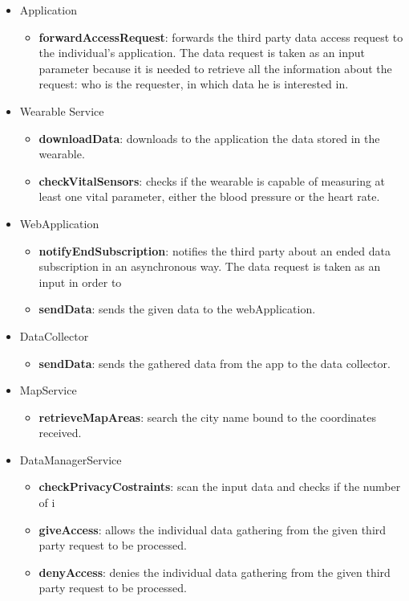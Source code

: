 \begin{itemize}
\item Application
\begin{itemize}
\item \textbf{forwardAccessRequest}: forwards the third party data access request to the individual's application. The data request is taken as an input parameter because it is needed to retrieve all the information about the request: who is the requester, in which data he is interested in.
\end{itemize}
\item Wearable Service
\begin{itemize}
\item \textbf{downloadData}: downloads to the application the data stored in the wearable.
\item \textbf{checkVitalSensors}: checks if the wearable is capable of measuring at least one vital parameter, either the blood pressure or the heart rate.
\end{itemize}
\item WebApplication
\begin{itemize}
\item \textbf{notifyEndSubscription}: notifies the third party about an ended data subscription in an asynchronous way. The data request is taken as an input in order to 
\item \textbf{sendData}: sends the given data to the webApplication.
\end{itemize}
\item DataCollector
\begin{itemize}
\item \textbf{sendData}: sends the gathered data from the app to the data collector.
\end{itemize}
\item MapService
\begin{itemize}
\item \textbf{retrieveMapAreas}: search the city name bound to the coordinates received.
\end{itemize}
\item DataManagerService
\begin{itemize}
\item \textbf{checkPrivacyCostraints}: scan the input data and checks if the number of i
\item \textbf{giveAccess}: allows the individual data gathering from the given third party request to be processed.
\item \textbf{denyAccess}: denies the individual data gathering from the given third party request to be processed.

\end{itemize}
\end{itemize}
